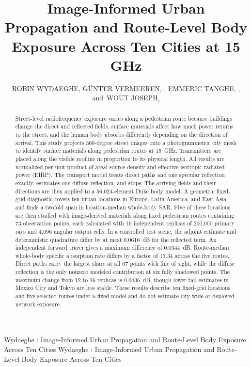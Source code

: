 \documentclass{ieeeaccess}
\begin{document}
\history{}
\doi{}

\title{Image-Informed Urban Propagation and Route-Level Body Exposure Across Ten Cities at 15 GHz}

\author{\uppercase{Robin Wydaeghe},
\uppercase{G\"unter Vermeeren}, ,
\uppercase{Emmeric Tanghe}, ,
and~\uppercase{Wout Joseph}, }

\address[1]{Department of Information Technology, Ghent University/IMEC,
9052 Ghent, Belgium (e-mail: robin.wydaeghe@ugent.be)}

\markboth
{Wydaeghe \headeretal: Image-Informed Urban Propagation and Route-Level Body Exposure Across Ten Cities}
{Wydaeghe \headeretal: Image-Informed Urban Propagation and Route-Level Body Exposure Across Ten Cities}


\begin{abstract}
Street-level radiofrequency exposure varies along a pedestrian route because
buildings change the direct and reflected fields, surface materials affect how
much power returns to the street, and the human body absorbs differently
depending on the direction of arrival. This study projects 360-degree street
images onto a photogrammetric city mesh to identify surface materials along
pedestrian routes at 15~GHz. Transmitters are placed along the visible
roofline in proportion to its physical length. All results are normalized per
unit product of areal source density and effective isotropic radiated power
(EIRP). The transport model treats direct
paths and one specular reflection exactly, estimates one diffuse reflection, and
stops. The arriving fields and their directions are then applied to a
56,024-element Duke body model. A geometric fixed-grid diagnostic covers ten
urban locations in Europe, Latin America, and East Asia and finds a twofold
span in location-median whole-body SAR. Five of these locations are then studied
with image-derived materials along fixed pedestrian routes containing 73
observation points, each calculated with 16 independent replicas of 200,000
primary rays and 4,096 angular output cells. In a controlled test scene, the
adjoint estimate and deterministic quadrature differ by at most 0.0616~dB for
the reflected term. An independent forward tracer gives a maximum difference
of 0.0344~dB. Route-median whole-body specific absorption rate differs by a
factor of 13.34 across the five routes. Direct paths carry the largest share at
all 67 points with line of sight, while the diffuse reflection is the only
nonzero modeled contribution at six fully shadowed points. The maximum change
from 12 to 16 replicas is 0.0436~dB, though lower-tail estimates in Mexico
City and Tokyo are less stable. These results describe ten fixed-grid locations
and five selected routes under a fixed model and do not estimate city-wide or
deployed-network exposure.
\end{abstract}
\end{document}
